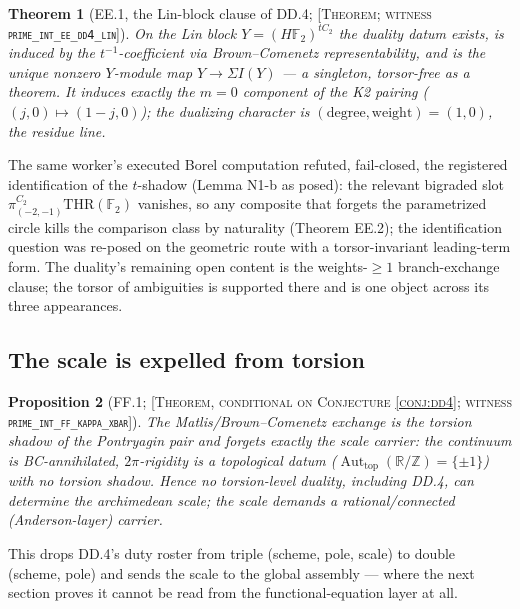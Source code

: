 \documentclass[11pt,reqno]{amsart}
\theoremstyle{plain}
\newtheorem{theorem}{Theorem}[section]
\newtheorem{proposition}[theorem]{Proposition}
\theoremstyle{definition}
\theoremstyle{remark}
\newcommand{\R}{\mathbb{R}}
\newcommand{\Z}{\mathbb{Z}}
\newcommand{\F}{\mathbb{F}}
\newcommand{\THR}{\mathrm{THR}}
\newcommand{\grade}[1]{\textup{[\textsc{#1}]}}
\DeclareMathOperator{\Aut}{Aut}
\begin{document}
\begin{theorem}[EE.1, the Lin-block clause of DD.4; \grade{Theorem; witness
\texttt{prime\_\allowbreak int\_\allowbreak ee\_\allowbreak dd4\_\allowbreak lin}}]\label{thm:ee1}
On the Lin block $Y = (H\F_2)^{tC_2}$ the duality datum exists, is induced by the
$t^{-1}$-coefficient via Brown--Comenetz representability, and is the \emph{unique} nonzero
$Y$-module map $Y \to \Sigma I(Y)$ --- a singleton, torsor-free as a theorem. It induces
exactly the $m = 0$ component of the K2 pairing ($(j, 0) \mapsto (1-j, 0)$); the dualizing
character is $(\mathrm{degree}, \mathrm{weight}) = (1, 0)$, the residue line.
\end{theorem}

The same worker's executed Borel computation refuted, fail-closed, the registered
identification of the $t$-shadow (Lemma N1-b as posed): the relevant bigraded slot
$\pi^{C_2}_{(-2,-1)}\THR(\F_2)$ vanishes, so any composite that forgets the parametrized
circle kills the comparison class by naturality (Theorem EE.2); the identification question
was re-posed on the geometric route with a torsor-invariant leading-term form. The duality's
remaining open content is the weights-$\ge 1$ branch-exchange clause; the torsor of
ambiguities is supported there and is one object across its three appearances.

\subsection{The scale is expelled from torsion}

\begin{proposition}[FF.1; \grade{Theorem, conditional on Conjecture \ref{conj:dd4}; witness
\texttt{prime\_\allowbreak int\_\allowbreak ff\_\allowbreak kappa\_\allowbreak xbar}}]\label{prop:ff1}
The Matlis/Brown--Comenetz exchange is the torsion shadow of the Pontryagin pair and forgets
exactly the scale carrier: the continuum is BC-annihilated, $2\pi$-rigidity is a topological
datum ($\Aut_{\mathrm{top}}(\R/\Z) = \{\pm 1\}$) with no torsion shadow. Hence no torsion-level
duality, including DD.4, can determine the archimedean scale; the scale demands a
rational/connected (Anderson-layer) carrier.
\end{proposition}

This drops DD.4's duty roster from triple (scheme, pole, scale) to double (scheme, pole) and
sends the scale to the global assembly --- where the next section proves it cannot be read
from the functional-equation layer at all.
\end{document}
